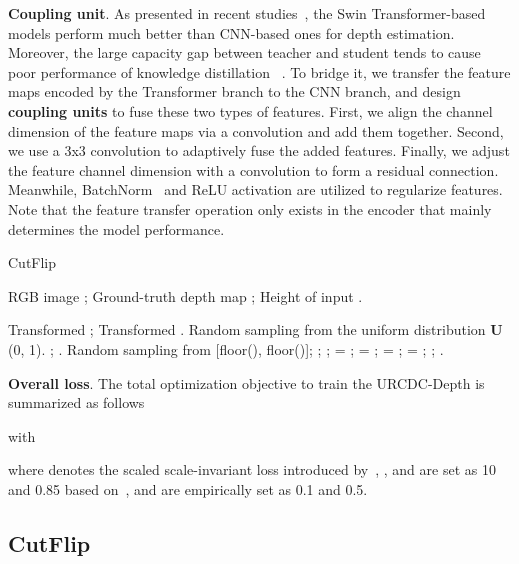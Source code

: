 \documentclass[letterpaper]{article} \usepackage{aaai23}  \usepackage{times}  \usepackage{helvet}  \usepackage{courier}  \usepackage[hyphens]{url}  \usepackage{graphicx} \urlstyle{rm} \def\UrlFont{\rm}  \usepackage{natbib}  \usepackage{caption} \frenchspacing  \setlength{\pdfpagewidth}{8.5in} \setlength{\pdfpageheight}{11in} \usepackage{algorithm}
\begin{document}
\textbf{Coupling unit}. As presented in recent studies~\cite{li2022depthformer, Yuan_2022_CVPR, lee2019big}, the Swin Transformer-based models perform much better than CNN-based ones for depth estimation. Moreover, the large capacity gap between teacher and student tends to cause poor performance of knowledge distillation ~\cite{hu2021boosting}. To bridge it, we transfer the feature maps encoded by the Transformer branch to the CNN branch, and design \textbf{coupling units} to fuse these two types of features. First, we align the channel dimension of the feature maps via a  convolution and add them together. Second, we use a 3x3 convolution to adaptively fuse the added features. Finally, we adjust the feature channel dimension with a  convolution to form a residual connection. Meanwhile, BatchNorm~\cite{ioffe2015batch} and ReLU activation are utilized to regularize features. Note that the feature transfer operation only exists in the encoder that mainly determines the model performance.

\begin{algorithm}
	\renewcommand{\algorithmicrequire}{\textbf{Input:}}
	\renewcommand{\algorithmicensure}{\textbf{Output:}}
	\caption{CutFlip}
	\label{alg1}
	\begin{algorithmic}[1]
		\REQUIRE RGB image ; Ground-truth depth map ; Height of input .
		
		\ENSURE Transformed ; Transformed .
		\STATE Random sampling  from the uniform distribution \textbf{U} (0, 1).
		\IF {}
		\RETURN ; .
		\ELSE
		\STATE Random sampling  from [floor(), floor()];
		\STATE ; ;
		\STATE  = ;  = ;
		\STATE  = ;  = ;
		\RETURN ; .
		\ENDIF
	\end{algorithmic}
\end{algorithm}
\textbf{Overall loss}. The total optimization objective to train the URCDC-Depth is summarized as follows

with

where  denotes the scaled scale-invariant loss introduced by~\cite{lee2019big}, ,  and  are set as 10 and 0.85 based on~\cite{lee2019big},  and  are empirically set as 0.1 and 0.5.


\subsection{CutFlip}
\end{document}
